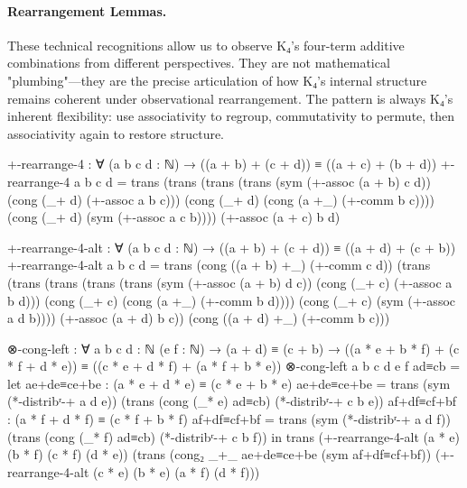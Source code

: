 \documentclass[11pt,a4paper]{book}
\begin{document}
\paragraph{Rearrangement Lemmas.}
These technical recognitions allow us to observe K₄'s four-term additive combinations from different perspectives. They are not mathematical "plumbing"—they are the precise articulation of how K₄'s internal structure remains coherent under observational rearrangement. The pattern is always K₄'s inherent flexibility: use associativity to regroup, commutativity to permute, then associativity again to restore structure.

\begin{code}
+-rearrange-4 : ∀ (a b c d : ℕ) → ((a + b) + (c + d)) ≡ ((a + c) + (b + d))
+-rearrange-4 a b c d =
  trans (trans (trans (trans (sym (+-assoc (a + b) c d))
                             (cong (_+ d) (+-assoc a b c)))
                      (cong (_+ d) (cong (a +_) (+-comm b c))))
                (cong (_+ d) (sym (+-assoc a c b))))
        (+-assoc (a + c) b d)

+-rearrange-4-alt : ∀ (a b c d : ℕ) → ((a + b) + (c + d)) ≡ ((a + d) + (c + b))
+-rearrange-4-alt a b c d =
  trans (cong ((a + b) +_) (+-comm c d))
        (trans (trans (trans (trans (trans (sym (+-assoc (a + b) d c))
                                            (cong (_+ c) (+-assoc a b d)))
                                     (cong (_+ c) (cong (a +_) (+-comm b d))))
                              (cong (_+ c) (sym (+-assoc a d b))))
                       (+-assoc (a + d) b c))
               (cong ((a + d) +_) (+-comm b c)))

⊗-cong-left : ∀ {a b c d : ℕ} (e f : ℕ)
            → (a + d) ≡ (c + b)
            → ((a * e + b * f) + (c * f + d * e)) ≡ ((c * e + d * f) + (a * f + b * e))
⊗-cong-left {a} {b} {c} {d} e f ad≡cb =
  let ae+de≡ce+be : (a * e + d * e) ≡ (c * e + b * e)
      ae+de≡ce+be = trans (sym (*-distribʳ-+ a d e)) 
                          (trans (cong (_* e) ad≡cb) 
                                 (*-distribʳ-+ c b e))
      af+df≡cf+bf : (a * f + d * f) ≡ (c * f + b * f)
      af+df≡cf+bf = trans (sym (*-distribʳ-+ a d f))
                          (trans (cong (_* f) ad≡cb)
                                 (*-distribʳ-+ c b f))
  in trans (+-rearrange-4-alt (a * e) (b * f) (c * f) (d * e))
           (trans (cong₂ _+_ ae+de≡ce+be (sym af+df≡cf+bf))
                  (+-rearrange-4-alt (c * e) (b * e) (a * f) (d * f)))
\end{code}
\end{document}
